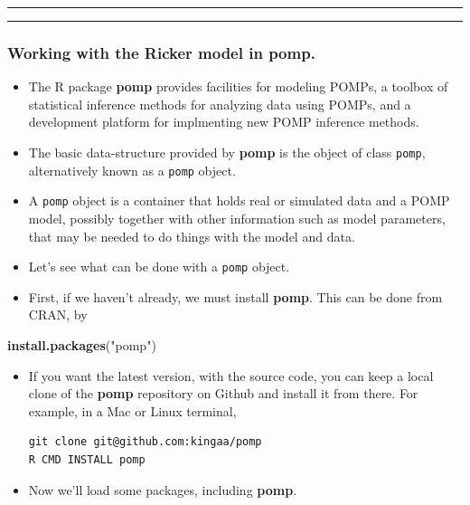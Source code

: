 \documentclass[]{article}
\newenvironment{Shaded}{\begin{snugshade}}{\end{snugshade}}
\newcommand{\KeywordTok}[1]{\textcolor[rgb]{0.13,0.29,0.53}{\textbf{#1}}}
\newcommand{\StringTok}[1]{\textcolor[rgb]{0.31,0.60,0.02}{#1}}
\newcommand{\NormalTok}[1]{#1}
\begin{document}
\begin{center}\rule{0.5\linewidth}{\linethickness}\end{center}

\begin{center}\rule{0.5\linewidth}{\linethickness}\end{center}

\subsubsection{\texorpdfstring{Working with the Ricker model in
\textbf{pomp}.}{Working with the Ricker model in pomp.}}\label{working-with-the-ricker-model-in-pomp.}

\begin{itemize}
\item
  The R package \textbf{pomp} provides facilities for modeling POMPs, a
  toolbox of statistical inference methods for analyzing data using
  POMPs, and a development platform for implmenting new POMP inference
  methods.
\item
  The basic data-structure provided by \textbf{pomp} is the object of
  class \texttt{pomp}, alternatively known as a \texttt{pomp} object.
\item
  A \texttt{pomp} object is a container that holds real or simulated
  data and a POMP model, possibly together with other information such
  as model parameters, that may be needed to do things with the model
  and data.
\item
  Let's see what can be done with a \texttt{pomp} object.
\item
  First, if we haven't already, we must install \textbf{pomp}. This can
  be done from CRAN, by
\end{itemize}

\begin{Shaded}
\begin{Highlighting}[]
\KeywordTok{install.packages}\NormalTok{(}\StringTok{"pomp"}\NormalTok{)}
\end{Highlighting}
\end{Shaded}

\begin{itemize}
\item
  If you want the latest version, with the source code, you can keep a
  local clone of the \textbf{pomp} repository on Github and install it
  from there. For example, in a Mac or Linux terminal,

\begin{verbatim}
git clone git@github.com:kingaa/pomp
R CMD INSTALL pomp
\end{verbatim}
\item
  Now we'll load some packages, including \textbf{pomp}.
\end{itemize}
\end{document}
